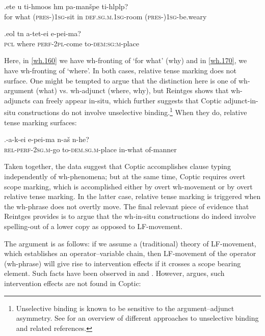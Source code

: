 \documentclass[charis]{glossa}
\begin{document}
\exg.\label{wh.160}et{\textbeta}e u ti-hmoos h{\textschwa}m pa-man\v{s}{\textopeno}pe ti-hl{\textschwa}pl{\textopeno}p?\\
   for what (\textsc{pres-})\textsc{1sg}-sit in \textsc{def.sg.m.1sg}-room (\textsc{pres-})\textsc{1sg}-be.weary\\

\exg.\label{wh.170}e{\textbeta}ol t{\textopeno}n a-tet{\textschwa}-ei e-pei-ma?\\
   \textsc{pcl} where \textsc{perf-2pl}-come to-\textsc{dem:sg:m}-place\\

Here, in \ref{wh.160} we have wh-fronting of `for what' (why) and in \ref{wh.170}, we have wh-fronting of `where'. In both cases, relative tense marking does not surface. One might be tempted to argue that the distinction here is one of wh-argument (what) vs. wh-adjunct (where, why), but Reintges shows that wh-adjuncts can freely appear in-situ, which further suggests that Coptic adjunct-in-situ constructions do not involve unselective binding.\footnote{Unselective binding is known to be sensitive to the argument--adjunct asymmetry. See \cite{cheng:2009} for an overview of different approaches to unselective binding and related references.} When they do, relative tense marking surfaces:

\exg.\label{wh.180}{\textschwa}-a-k-ei e-pei-ma {\textschwa}n-a\v{s} {\textschwa}n-he?\\
   \textsc{rel-perf-2sg.m}-go to-\textsc{dem.sg.m}-place in-what of-manner\\

Taken together, the data suggest that Coptic accomplishes clause typing independently of wh-phenomena; but at the same time, Coptic requires overt scope marking, which is accomplished either by overt wh-movement or by overt relative tense marking. In the latter case, relative tense marking is triggered when the wh-phrase does not overtly move. The final relevant piece of evidence that Reintges provides is to argue that the wh-in-situ constructions do indeed involve spelling-out of a lower copy as opposed to LF-movement.

The argument is as follows: if we assume a (traditional) theory of LF-movement, which establishes an operator--variable chain, then LF-movement of the operator (wh-phrase) will give rise to intervention effects if it crosses a scope bearing element. Such facts have been observed in \cite{beck:1996} and \cite{beck-kim:1997}. However, \cite{reintges:2007} argues, such intervention effects are not found in Coptic:
\end{document}
